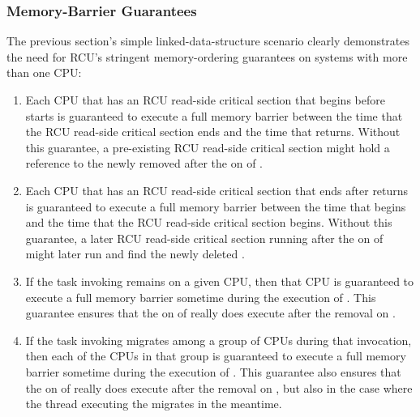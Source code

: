 \subsubsection{Memory-Barrier Guarantees}

The previous section's simple linked-data-structure scenario clearly
demonstrates the need for RCU's stringent memory-ordering guarantees on
systems with more than one CPU\@:

\begin{enumerate}
\item Each CPU that has an RCU read-side critical section that begins
   before  starts is guaranteed to execute a full
   memory barrier between the time that the RCU read-side critical
   section ends and the time that  returns.
   Without
   this guarantee, a pre-existing RCU read-side critical section might
   hold a reference to the newly removed  after the
    on \clnref{} %
   of .
\item Each CPU that has an RCU read-side critical section that ends after
    returns is guaranteed to execute a full memory
   barrier between the time that  begins and the
   time that the RCU read-side critical section begins.
   Without this
   guarantee, a later RCU read-side critical section running after the
    on \clnref{} %
   of  might later run
    and find the newly deleted .
\item If the task invoking  remains on a given CPU,
   then that CPU is guaranteed to execute a full memory barrier sometime
   during the execution of .
   This guarantee ensures
   that the  on \clnref{} %
   of  really
   does execute after the removal on \clnref{}. %
\item If the task invoking  migrates among a group of
   CPUs during that invocation, then each of the CPUs in that group is
   guaranteed to execute a full memory barrier sometime during the
   execution of .
   This guarantee also ensures that
   the  on \clnref{} %
   of  really does
   execute after the removal on \clnref{}, %
   but also in the case where the
   thread executing the  migrates in the meantime.
\end{enumerate}


